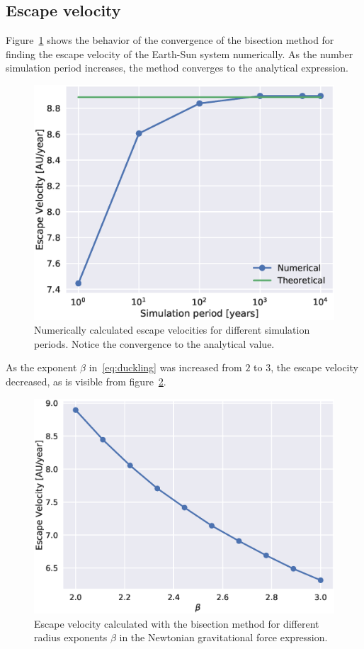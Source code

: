 \documentclass[aps,reprint]{revtex4-1}
\begin{document}
\subsection{Escape velocity}

Figure~\ref{fig:escvel} shows the behavior of the convergence of the bisection
method for finding the escape velocity of the Earth-Sun system numerically. As
the number simulation period increases, the method converges to the analytical
expression. 
\begin{figure}[H]
  \includegraphics[width=\columnwidth]{figures/escapevelocity.eps}
  \caption{Numerically calculated escape velocities for different simulation
  periods. Notice the convergence to the analytical value.}
  \label{fig:escvel}
\end{figure}

As the exponent \(\beta\) in~\eqref{eq:duckling} was increased from \(2\) to
\(3\), the escape velocity decreased, as is visible from figure~\ref{fig:hei}.
\begin{figure}[H]
  \includegraphics[width=\columnwidth]{figures/escapevelocitybeta.eps}
  \caption{Escape velocity calculated with the bisection method for different
  radius exponents $\beta$ in the Newtonian gravitational force expression.}
  \label{fig:hei}
\end{figure}
\end{document}
